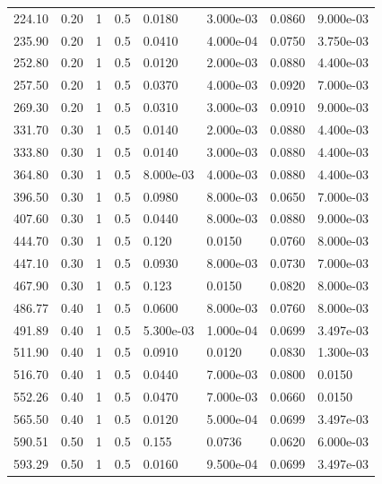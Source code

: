 \documentclass[preview]{standalone}
\begin{document}
{{\begin{tabular}{L{1.2cm}C{1.2cm} C{0.3cm}C{0.5cm} C{1.4cm}C{1.4cm} C{1.4cm}C{1.4cm}}
  224.10  &  0.20  & 1     & 0.5 &  0.0180  & 3.000e-03  & 0.0860 &  9.000e-03   \\ 
  235.90  &  0.20  & 1     & 0.5 &  0.0410  & 4.000e-04  & 0.0750 &  3.750e-03   \\ 
  252.80  &  0.20  & 1     & 0.5 &  0.0120  & 2.000e-03  & 0.0880 &  4.400e-03   \\ 
  257.50  &  0.20  & 1     & 0.5 &  0.0370  & 4.000e-03  & 0.0920 &  7.000e-03   \\ 
  269.30  &  0.20  & 1     & 0.5 &  0.0310  & 3.000e-03  & 0.0910 &  9.000e-03   \\ 
  331.70  &  0.30  & 1     & 0.5 &  0.0140  & 2.000e-03  & 0.0880 &  4.400e-03   \\ 
  333.80  &  0.30  & 1     & 0.5 &  0.0140  & 3.000e-03  & 0.0880 &  4.400e-03   \\ 
  364.80  &  0.30  & 1     & 0.5 &  8.000e-03  & 4.000e-03  & 0.0880 &  4.400e-03   \\ 
  396.50  &  0.30  & 1     & 0.5 &  0.0980  & 8.000e-03  & 0.0650 &  7.000e-03   \\ 
  407.60  &  0.30  & 1     & 0.5 &  0.0440  & 8.000e-03  & 0.0880 &  9.000e-03   \\ 
  444.70  &  0.30  & 1     & 0.5 &  0.120  & 0.0150  & 0.0760 &  8.000e-03   \\ 
  447.10  &  0.30  & 1     & 0.5 &  0.0930  & 8.000e-03  & 0.0730 &  7.000e-03   \\ 
  467.90  &  0.30  & 1     & 0.5 &  0.123  & 0.0150  & 0.0820 &  8.000e-03   \\ 
  486.77  &  0.40  & 1     & 0.5 &  0.0600  & 8.000e-03  & 0.0760 &  8.000e-03   \\ 
  491.89  &  0.40  & 1     & 0.5 &  5.300e-03  & 1.000e-04  & 0.0699 &  3.497e-03   \\ 
  511.90  &  0.40  & 1     & 0.5 &  0.0910  & 0.0120  & 0.0830 &  1.300e-03   \\ 
  516.70  &  0.40  & 1     & 0.5 &  0.0440  & 7.000e-03  & 0.0800 &  0.0150   \\ 
  552.26  &  0.40  & 1     & 0.5 &  0.0470  & 7.000e-03  & 0.0660 &  0.0150   \\ 
  565.50  &  0.40  & 1     & 0.5 &  0.0120  & 5.000e-04  & 0.0699 &  3.497e-03   \\ 
  590.51  &  0.50  & 1     & 0.5 &  0.155  & 0.0736  & 0.0620 &  6.000e-03   \\ 
  593.29  &  0.50  & 1     & 0.5 &  0.0160  & 9.500e-04  & 0.0699 &  3.497e-03   \\ 

\end{tabular}}}
\end{document}
